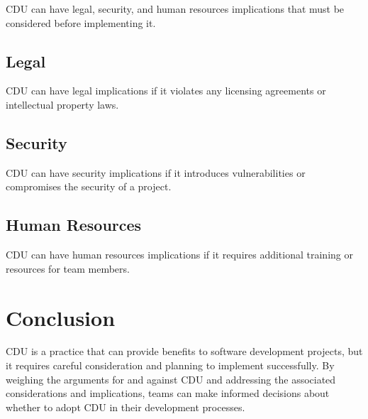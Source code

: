 \documentclass{article}
\begin{document}
CDU can have legal, security, and human resources implications that must be considered before implementing it.

\subsection{Legal}
\label{subsec:legal}

CDU can have legal implications if it violates any licensing agreements or intellectual property laws.

\subsection{Security}
\label{subsec:security-1}

CDU can have security implications if it introduces vulnerabilities or compromises the security of a project.

\subsection{Human Resources}
\label{subsec:human-resources}

CDU can have human resources implications if it requires additional training or resources for team members.

\section{Conclusion}
\label{sec:conclusion}

CDU is a practice that can provide benefits to software development projects, but it requires careful consideration and planning to implement successfully. By weighing the arguments for and against CDU and addressing the associated considerations and implications, teams can make informed decisions about whether to adopt CDU in their development processes.
\end{document}
